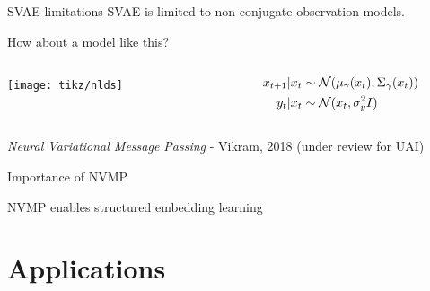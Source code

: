 \documentclass[10pt, compress]{beamer}
\begin{document}
\begin{frame}{SVAE limitations}
  \centering
  SVAE is limited to non-conjugate observation models. 
  
  \pause
  How about a model like this?
  \pause
  \vspace{40pt}

  \begin{columns}
    \begin{column}{0.3\textwidth}
      \texttt{[image: tikz/nlds]}
    \end{column}
    \begin{column}{0.3\textwidth}
      \begin{align*}
          x_{t + 1} | x_t &\sim \mathcal{N}(\mu_\gamma(x_t), \Sigma_\gamma(x_t)) \\
          y_t | x_t &\sim \mathcal{N}(x_t, \sigma^2_yI)
      \end{align*}
    \end{column}
  \end{columns}
  \pause
  \vspace{20pt}
  \emph{Neural Variational Message Passing} - Vikram, 2018 (under review for UAI)
\end{frame}


\begin{frame}{Importance of NVMP}
  \begin{center}
    NVMP enables structured embedding learning
  \end{center}
\end{frame}

\section{Applications}


\end{document}
